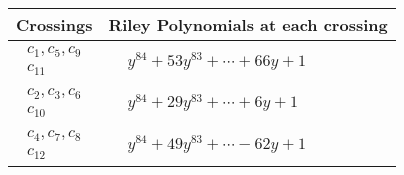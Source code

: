 \documentclass[1p]{elsarticle_modified}
\theoremstyle{definition}
\begin{document}
\begin{tabular}{m{50pt}|m{274pt}}
Crossings & \hspace{64pt}Riley Polynomials at each crossing \\
\hline $$\begin{aligned}c_{1},c_{5},c_{9}\\c_{11}\end{aligned}$$&$\begin{aligned}
&y^{84}+53 y^{83}+\cdots+66 y+1
\end{aligned}$\\
\hline $$\begin{aligned}c_{2},c_{3},c_{6}\\c_{10}\end{aligned}$$&$\begin{aligned}
&y^{84}+29 y^{83}+\cdots+6 y+1
\end{aligned}$\\
\hline $$\begin{aligned}c_{4},c_{7},c_{8}\\c_{12}\end{aligned}$$&$\begin{aligned}
&y^{84}+49 y^{83}+\cdots-62 y+1
\end{aligned}$\\
\hline
\end{tabular}
\vskip 2pc
\end{document}
